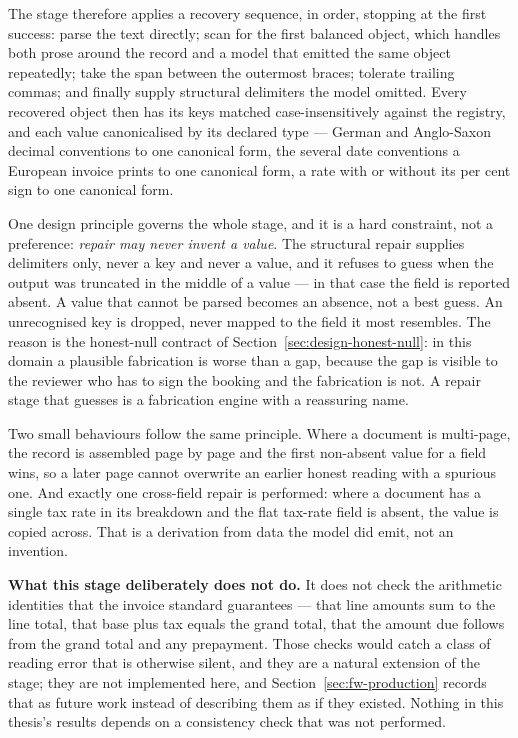 The stage therefore applies a recovery sequence, in order, stopping at the first success:
parse the text directly; scan for the first balanced object, which handles both prose around
the record and a model that emitted the same object repeatedly; take the span between the
outermost braces; tolerate trailing commas; and finally supply structural delimiters the model
omitted. Every recovered object then has its keys matched case-insensitively against the
registry, and each value canonicalised by its declared type --- German and Anglo-Saxon decimal
conventions to one canonical form, the several date conventions a European invoice prints to
one canonical form, a rate with or without its per cent sign to one canonical form.

One design principle governs the whole stage, and it is a hard constraint, not a
preference: \emph{repair may never invent a value}. The structural repair supplies delimiters
only, never a key and never a value, and it refuses to guess when the output was truncated in
the middle of a value --- in that case the field is reported absent. A value that cannot be
parsed becomes an absence, not a best guess. An unrecognised key is dropped, never
mapped to the field it most resembles. The reason is the honest-null contract of
Section~\ref{sec:design-honest-null}: in this domain a plausible fabrication is worse than a gap,
because the gap is visible to the reviewer who has to sign the booking and the fabrication is
not. A repair stage that guesses is a fabrication engine with a reassuring name.

Two small behaviours follow the same principle. Where a document is multi-page, the record is
assembled page by page and the first non-absent value for a field wins, so a later page cannot
overwrite an earlier honest reading with a spurious one. And exactly one cross-field repair is
performed: where a document has a single tax rate in its breakdown and the flat tax-rate field
is absent, the value is copied across. That is a derivation from data the model did emit, not
an invention.

\textbf{What this stage deliberately does not do.} It does not check the arithmetic identities
that the invoice standard guarantees --- that line amounts sum to the line total, that base plus
tax equals the grand total, that the amount due follows from the grand total and any prepayment.
Those checks would catch a class of reading error that is otherwise silent, and they are a
natural extension of the stage; they are not implemented here, and Section~\ref{sec:fw-production}
records that as future work instead of describing them as if they existed. Nothing in this
thesis's results depends on a consistency check that was not performed.

